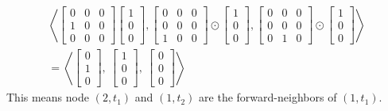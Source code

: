 \documentclass[11pt,conference,compsocconf]{IEEEtran}
\theoremstyle{definition}
\begin{document}
\begin{align*}
\left\langle
  \begin{bmatrix}
    0 & 0 & 0 \\
    1 & 0 & 0 \\
    0 & 0 & 0
  \end{bmatrix}\!\!\!\!
\begin{bmatrix}
1 \\
0 \\
0
\end{bmatrix}
,
 \begin{bmatrix}
   0 & 0 & 0 \\
   0 & 0 & 0 \\
   1 & 0 & 0
 \end{bmatrix}\!\!
\odot\!\!
\begin{bmatrix}
1 \\
0 \\
0
\end{bmatrix}
,
 \begin{bmatrix}
  0 & 0 & 0 \\
  0 & 0 & 0 \\
  0 & 1 & 0
 \end{bmatrix}\!\!
\odot\!\!
\begin{bmatrix}
1 \\
0 \\
0
\end{bmatrix}
\right\rangle
\\
=
\left\langle
\begin{bmatrix}
0 \\
1 \\
0
\end{bmatrix},~
\begin{bmatrix}
1 \\
0 \\
0
\end{bmatrix},~
\begin{bmatrix}
0 \\
0 \\
0
\end{bmatrix}
\right\rangle
\end{align*}
This means node $(2,t_1)$ and $(1,t_2)$ are the forward-neighbors of $(1,t_1)$.
\end{document}
